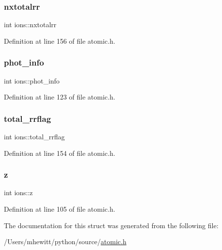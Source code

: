 \subsubsection{\texorpdfstring{nxtotalrr}{nxtotalrr}}
{\footnotesize\ttfamily int ions\+::nxtotalrr}



Definition at line 156 of file atomic.\+h.

\mbox{\label{structions_ab41b47c0eb38c886ea1ba28b864f6e5c}} 
\subsubsection{\texorpdfstring{phot\+\_\+info}{phot\_info}}
{\footnotesize\ttfamily int ions\+::phot\+\_\+info}



Definition at line 123 of file atomic.\+h.

\mbox{\label{structions_a73b46d8ed6dd94e4d7cb4e45dada08d2}} 
\subsubsection{\texorpdfstring{total\+\_\+rrflag}{total\_rrflag}}
{\footnotesize\ttfamily int ions\+::total\+\_\+rrflag}



Definition at line 154 of file atomic.\+h.

\mbox{\label{structions_a7921d204910e66ef597652fd718a6e30}} 
\subsubsection{\texorpdfstring{z}{z}}
{\footnotesize\ttfamily int ions\+::z}



Definition at line 105 of file atomic.\+h.



The documentation for this struct was generated from the following file\+:\begin{DoxyCompactItemize}
\item 
/\+Users/mhewitt/python/source/\hyperlink{atomic_8h}{atomic.\+h}\end{DoxyCompactItemize}
